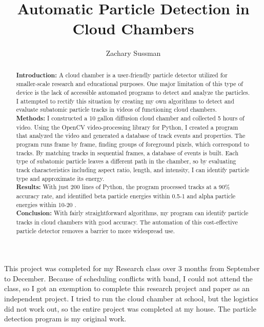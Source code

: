 \documentclass[notitlepage]{article}
\author{Zachary Sussman}
\title{Automatic Particle Detection in Cloud Chambers}
\date{}
\begin{document}
 



\maketitle

\begin{abstract}
\noindent
\textbf{Introduction:} A cloud chamber is a user-friendly particle detector utilized for smaller-scale research and educational purposes.  One major limitation of this type of device is the lack of accessible automated programs to detect and analyze the particles. I attempted to rectify this situation by creating my own algorithms to detect and evaluate subatomic particle tracks in videos of functioning cloud chambers.
\\ \textbf{Methods:} I constructed a 10 gallon diffusion cloud chamber and collected 5 hours of video.  Using the OpenCV video-processing library for Python, I created a program that analyzed the video and generated a database of track events and properties. The program runs frame by frame, finding groups of foreground pixels, which correspond to tracks.  By matching tracks in sequential frames, a database of events is built. Each type of subatomic particle leaves a different path in the chamber, so by evaluating track characteristics including aspect ratio, length, and intensity, I can identify particle type and approximate its energy.
\\ \textbf{Results:} With just 200 lines of Python, the program processed tracks at a 90\% accuracy rate, and identified beta particle energies within 0.5-1 \kilo{}\electronvolt and alpha particle energies within 10-20 \kilo{}\electronvolt. 
\\ \textbf{Conclusion:} With fairly straightforward algorithms, my program can identify particle tracks in cloud chambers with good accuracy. The automation of this cost-effective particle detector removes a barrier to more widespread use.


\end{abstract}

\clearpage

This project was completed for my Research class over 3 months from September to December.  Because of scheduling conflicts with band, I could not attend the class, so I got an exemption to complete this research project and paper as an independent project.  I tried to run the cloud chamber at school, but the logistics did not work out, so the entire project was completed at my house.  The particle detection program is my original work.
\end{document}

